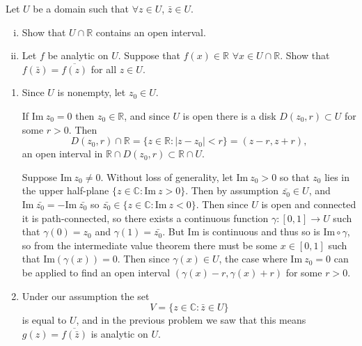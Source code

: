 \documentclass{article}
\newcounter{Problem}
\newenvironment{Problem}{\begin{Exercise}[name={Problem},
                                          counter={Problem}]}
                        {\end{Exercise}}
\begin{document}
\begin{Problem}
  Let $U$ be a domain such that $\forall z \in U$, $\bar{z} \in U$.
  \begin{enumerate}[(i)]
    \item{
      Show that $U \cap \mathbb{R}$ contains an open interval.
    }
    \item{
      Let $f$ be analytic on $U$. Suppose that $f(x) \in \mathbb{R}$
      $\forall x \in U \cap \mathbb{R}$. Show that $f(\bar{z}) = \overline{f(z)}$
      for all $z \in U$.
    }
  \end{enumerate}
\end{Problem}

\begin{Answer}
  \begin{enumerate}
    \item{
      Since $U$ is nonempty, let $z_0 \in U$.

      If $\mathrm{Im}~z_0 = 0$
      then $z_0 \in \mathbb{R}$, and since $U$ is open there is a disk
      $D(z_0, r) \subset U$ for some $r > 0$. Then
      $$
        D(z_0, r) \cap \mathbb{R}
      = \{ z \in \mathbb{R} : |z - z_0| < r \}
      = (z-r, z+r),
      $$
      an open interval in
      $\mathbb{R} \cap D(z_0, r) \subset \mathbb{R} \cap U$.

      Suppose $\mathrm{Im}~z_0 \neq 0$. Without loss of generality,
      let $\mathrm{Im}~z_0 > 0$ so that $z_0$ lies in the upper half-plane
      $\{ z \in \mathbb{C} : \mathrm{Im}~z > 0 \}$. Then
      by assumption $\bar{z_0} \in U$, and
      $\mathrm{Im}~\bar{z_0} = -\mathrm{Im}~\bar{z_0}$ so
      $\bar{z_0} \in \{ z \in \mathbb{C} : \mathrm{Im}~z < 0 \}$.
      Then since $U$ is open and connected it is path-connected, so
      there exists a continuous function $\gamma: [0, 1] \to U$ such
      that $\gamma(0) = z_0$ and $\gamma(1) = \bar{z_0}$. But
      $\mathrm{Im}$ is continuous and thus so is
      $\mathrm{Im} \circ \gamma$, so from the intermediate value
      theorem there must be some $x \in [0, 1]$ such that
      $\mathrm{Im}(\gamma(x)) = 0$. Then since $\gamma(x) \in U$, the case
      where $\mathrm{Im}~z_0 = 0$ can be applied to find an open
      interval $(\gamma(x) - r, \gamma(x) + r)$ for some $r > 0$.
    }
    \item{
      Under our assumption the set
      $$
      V = \{ z \in \mathbb{C} : \bar{z} \in U \}
      $$
      is equal to $U$, and in the previous problem we saw that
      this means $g(z) = \overline{f(\bar{z})}$ is analytic on
      $U$.

}
\end{enumerate}
\end{Answer}
\end{document}
